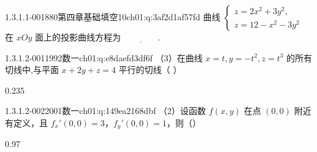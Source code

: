 \par\addvspace{2.4ex}\noindent
\begin{minipage}{\linewidth}



\begin{q}{1.3.1.1-001}{880第四章基础填空10}{ch01:q:3af2d1af57fd}
曲线 $\begin{cases} z=2x^2+3y^2, \\ z=12-x^2-3y^2 \end{cases}$ 在 $xOy$ 面上的投影曲线方程为 $\underline{\hspace{4em}}$.
\end{q}
\end{minipage}


\par\addvspace{2.4ex}\noindent
\begin{minipage}{\linewidth}

\begin{q}{1.3.1.2-001}{1992数一}{ch01:q:e8daefd3df6f}
（3）在曲线 $x=t,y=-t^2,z=t^3$ 的所有切线中,与平面 $x+2y+z=4$ 平行的切线（ ）
\begin{opts}{0.235}
\hfill{}\hfill{}\hfill{}
\end{opts}
\end{q}
\end{minipage}


\begin{q}{1.3.1.2-002}{2001数一}{ch01:q:149ea2168dbf}
（2）设函数 $f(x,y)$ 在点 $(0,0)$ 附近有定义，且 $f_x'(0,0)=3$，$f_y'(0,0)=1$，则（\quad）
\begin{opts}{0.97}
\\[0.3ex]
\\[0.3ex]
\\[0.3ex]
\end{opts}
\end{q}

